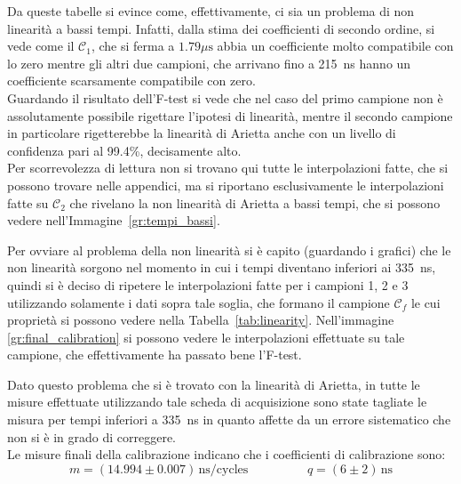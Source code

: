 Da queste tabelle si evince come, effettivamente, ci sia un problema di non linearità a bassi tempi. Infatti, dalla stima dei coefficienti di secondo ordine, si vede come il $\mathcal{C}_1$, che si ferma a $1.79 \mu\text{s}$ abbia un coefficiente molto compatibile con lo zero mentre gli altri due campioni, che arrivano fino a 215~ns hanno un coefficiente scarsamente compatibile con zero.\\

Guardando il risultato dell'F-test si vede che nel caso del primo campione non è assolutamente possibile rigettare l'ipotesi di linearità, mentre il secondo campione in particolare rigetterebbe la linearità di Arietta anche con un livello di confidenza pari al 99.4\%, decisamente alto.\\


Per scorrevolezza di lettura non si trovano qui tutte le interpolazioni fatte, che si possono trovare nelle appendici, ma si riportano esclusivamente le interpolazioni fatte su $\mathcal{C}_2$  che rivelano la non linearità di Arietta a bassi tempi, che si possono vedere nell'Immagine~\ref{gr:tempi_bassi}.\\

Per ovviare al problema della non linearità si è capito (guardando i grafici) che le non linearità sorgono nel momento in cui i tempi diventano inferiori ai 335~ns, quindi si è deciso di ripetere le interpolazioni fatte per i campioni 1, 2 e 3 utilizzando solamente i dati sopra tale soglia, che formano il campione $\mathcal{C}_f$ le cui proprietà si possono vedere nella Tabella~\ref{tab:linearity}. Nell'immagine \ref{gr:final_calibration} si possono vedere le interpolazioni effettuate su tale campione, che effettivamente ha passato bene l'F-test.\\

Dato questo problema che si è trovato con la linearità di Arietta, in tutte le misure effettuate utilizzando tale scheda di acquisizione sono state tagliate le misura per tempi inferiori a 335~ns in quanto affette da un errore sistematico che non si è in grado di correggere.\\

Le misure finali della calibrazione indicano che i coefficienti di calibrazione sono:
\begin{equation}
  m = (14.994 \pm 0.007) \, \text{ns/cycles} \hspace{2cm} q = (6 \pm 2) \, \text{ns}
\end{equation}


